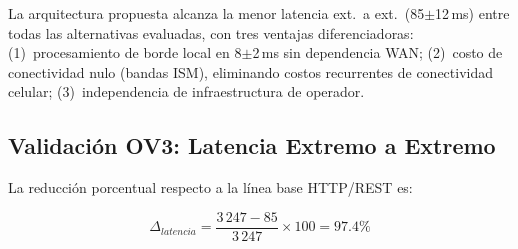 \begin{table}[htbp]
\centering
\caption{Comparación latencia ext. a ext. y características frente a tecnologías AMI alternativas}
\label{tab:comparacion-latencia-tecnologias}
\end{table}

La arquitectura propuesta alcanza la menor latencia ext.\ a ext.\ (85$\pm$12\,ms) entre todas las alternativas evaluadas, con tres ventajas diferenciadoras: (1)~procesamiento de borde local en 8$\pm$2\,ms sin dependencia WAN; (2)~costo de conectividad nulo (bandas ISM), eliminando costos recurrentes de conectividad celular; (3)~independencia de infraestructura de operador.

\subsection{Validación OV3: Latencia Extremo a Extremo}
\label{sec:resultados-latencia-h3}

La reducción porcentual respecto a la línea base HTTP/REST es:

\begin{equation}
\Delta_{latencia} = \frac{3\,247 - 85}{3\,247} \times 100 = 97.4\%
\label{eq:reduccion-latencia}
\end{equation}

